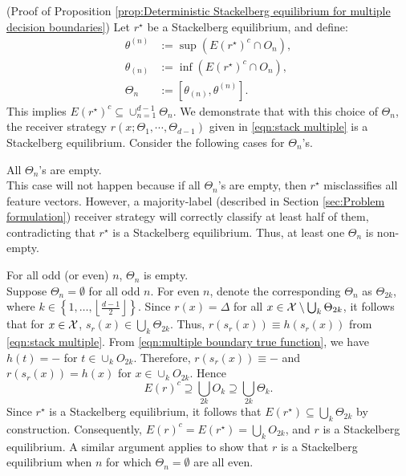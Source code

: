\begin{apdxproof}(Proof of Proposition \ref{prop:Deterministic Stackelberg equilibrium for multiple decision boundaries})\label{proof:Deterministic Stackelberg equilibrium for multiple decision boundaries}
    \setcounter{claims}{0}
	Let $r^\star$ be a Stackelberg equilibrium, and define:
	\begin{equation*}
		\begin{aligned}
			\theta^{(n)} &:= \sup (E(r^\star)^c \cap O_n), \\
			\theta_{(n)} &:= \inf (E(r^\star)^c \cap O_n), \\
			\Theta_n &:= [\theta_{(n)}, \theta^{(n)}].
		\end{aligned}
	\end{equation*}
	This implies $E(r^\star)^c \subseteq \cup_{n=1}^{d-1} \Theta_n$. We demonstrate that with this choice of $\Theta_n$, the receiver strategy $r(x;\Theta_1,\cdots, \Theta_{d-1})$ given in \eqref{eqn:stack multiple} is a Stackelberg equilibrium. Consider the following cases for $\Theta_n$'s. \\

	\begin{case}{All $\Theta_n$'s are empty.}\\
    This case will not happen because if all $\Theta_n$'s are empty, then $r^\star$ misclassifies all feature vectors. However, a majority-label (described in Section \ref{sec:Problem formulation}) receiver strategy will correctly classify at least half of them, contradicting that $r^\star$ is a Stackelberg equilibrium. Thus, at least one $\Theta_n$ is non-empty.
	\end{case}

\begin{case}{For all odd (or even) $n$, $\Theta_n$ is empty.}\\
Suppose $\Theta_n = \emptyset$ for all odd $n$. For even $n$, denote the corresponding $\Theta_n$ as $\Theta_{2k}$, where $k \in \left\{1, \dots, \left\lfloor \frac{d-1}{2} \right\rfloor \right\}$.
Since $r(x) = \Delta$ for all $x \in \mathcal{X} \setminus \bigcup_k \Theta_{2k}$, it follows that for $x \in 
 \mathcal{X}$, $s_r(x) \in \bigcup_k \Theta_{2k}$. Thus, $r(s_r(x)) \equiv h(s_r(x))$ from \eqref{eqn:stack multiple}.
From \eqref{eqn:multiple boundary true function}, we have $ h(t) = \minus$ for $t \in \cup_kO_{2k}$. Therefore, $r(s_r(x)) \equiv \minus$ and
$r(s_r(x)) = h(x)$ for $x \in \cup_kO_{2k}.$ Hence 
\[
E(r)^c \supseteq \bigcup_{2k} O_k \supseteq \bigcup_{2k} \Theta_k.
\]
Since $r^\star$ is a Stackelberg equilibrium, it follows that $E(r^\star) \subseteq \bigcup_k \Theta_{2k}$ by construction. Consequently, $E(r)^c = E(r^\star) = \bigcup_k O_{2k}$, and $r$ is a Stackelberg equilibrium.
A similar argument applies to show that $r$ is a Stackelberg equilibrium when $n$ for which $\Theta_n = \emptyset$ are all even.
\end{case}


\end{apdxproof}
